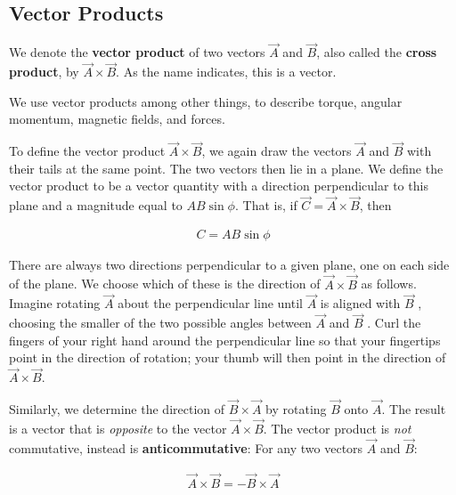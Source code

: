 \subsection*{Vector Products}
We denote the \textbf{vector product} of two vectors $\overrightarrow{A}$ and $\overrightarrow{B}$, also called the \textbf{cross product}, by $\overrightarrow{A} \times \overrightarrow{B}$. As the name indicates, this is a vector. 
\begin{tipbox}
We use vector products among other things, to describe torque, angular momentum, magnetic fields, and forces.
\end{tipbox}
To define the vector product  $\overrightarrow{A} \times \overrightarrow{B}$, we again draw the vectors  $\overrightarrow{A}$ and $\overrightarrow{B}$ with their tails at the same point. The two vectors then lie in a plane. We define the vector product to be a vector quantity with a direction perpendicular to this plane and a magnitude equal to $AB\sin\phi$. That is, if $\overrightarrow{C} = \overrightarrow{A} \times \overrightarrow{B}$, then
\begin{mathbox}
\begin{align*}
C = A B \sin \phi
\end{align*}
\end{mathbox}
There are always two directions perpendicular to a given plane, one on each side of the plane. We choose which of these is the direction of $\overrightarrow{A} \times \overrightarrow{B}$ as follows. Imagine rotating $\overrightarrow{A}$ about the perpendicular line until $\overrightarrow{A}$ is aligned with $\overrightarrow{B}$ , choosing the smaller of the two possible angles between $\overrightarrow{A}$ and $\overrightarrow{B}$ . Curl the fingers of your right hand around the perpendicular line so that your fingertips point in the direction of rotation; your thumb will then point in the direction of $\overrightarrow{A} \times \overrightarrow{B}$.

Similarly, we determine the direction of $\overrightarrow{B} \times \overrightarrow{A}$ by rotating $\overrightarrow{B}$ onto $\overrightarrow{A}$. The result is a vector that is \textit{opposite} to the vector $\overrightarrow{A} \times \overrightarrow{B}$. The vector product is \textit{not} commutative, instead is \textbf{anticommutative}: For any two vectors $\overrightarrow{A}$ and $\overrightarrow{B}$:
\begin{mathbox}
\begin{align*}
\overrightarrow{A} \times \overrightarrow{B} = - \overrightarrow{B} \times \overrightarrow{A}
\end{align*}
\end{mathbox}

